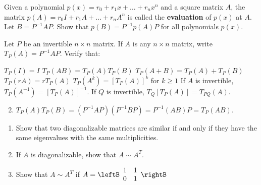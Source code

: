 \begin{multicols}{2}
\begin{ex}
\begin{sol}
\begin{enumerate}[label={\alph*.}]
\end{enumerate}
\end{sol}
\end{ex}

\begin{ex}
Given a polynomial $p(x) = r_{0} + r_{1}x + \dots + r_{n}x^{n}$ and a square matrix $A$, the matrix $p(A) = r_{0}I + r_{1}A + \dots  + r_{n}A^{n}$ is called the \textbf{evaluation} of $p(x)$ at $A$. Let $B = P^{-1}AP$. Show that $p(B) = P^{-1}p(A)P$ for all polynomials $p(x)$.
\end{ex}

\begin{ex}
	\label{ex:5_5_12}
Let $P$ be an invertible $n \times n$ matrix. If $A$ is any $n \times n$ matrix, write $T_{P}(A) = P^{-1}AP$. Verify that:

\begin{exenumerate}
\exitem $T_{P}(I) = I$
\exitem $T_{P}(AB) = T_{P}(A)T_{P}(B)$
\exitem $T_{P}(A + B) = T_{P}(A) + T_{P}(B)$
\exitem $T_{P}(rA) = rT_{P}(A)$
\exitem* $T_{P}(A^{k}) = [T_{P}(A)]^{k}$ for $k \geq 1$
\exitem* If $A$ is invertible, $T_{P}(A^{-1}) = [T_{P}(A)]^{-1}$.
\exitem* If $Q$ is invertible, $T_{Q}[T_{P}(A)] = T_{PQ}(A)$.
\end{exenumerate}
\begin{sol}
\begin{enumerate}[label={\alph*.}]
\setcounter{enumi}{1}
\item  $T_{P}(A)T_{P}(B) = (P^{-1}AP)(P^{-1}BP) = P^{-1}(AB)P = T_{P}(AB)$.

\end{enumerate}
\end{sol}
\end{ex}

\begin{ex}
\begin{enumerate}[label={\alph*.}]
\item Show that two diagonalizable matrices are similar if and only if they have the same eigenvalues with the same multiplicities.

\item If $A$ is diagonalizable, show that $A \sim A^{T}$.

\item Show that $A \sim A^{T}$ if 
 $A = \leftB \begin{array}{rr}
 1 & 1 \\
 0 & 1
 \end{array} \rightB $


\end{enumerate}
\end{ex}
\end{multicols}
